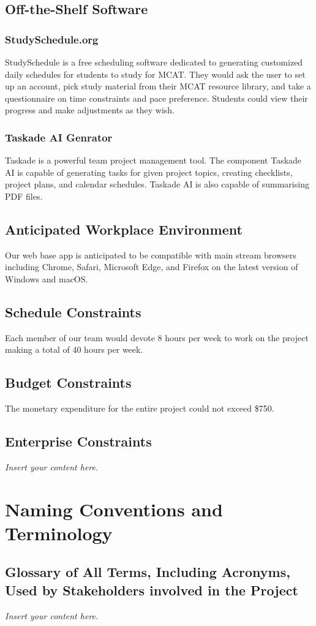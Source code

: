 \documentclass[12pt]{article}
\newcommand{\lips}{\textit{Insert your content here.}}
\begin{document}
\subsection{Off-the-Shelf Software}
\subsubsection{StudySchedule.org}
StudySchedule is a free scheduling software dedicated to generating customized daily schedules for students to study for MCAT. They would ask the user to set up an account, pick study material from their MCAT resource library, and take a questionnaire on time constraints and pace preference. Students could view their progress and make adjustments as they wish.
\subsubsection{Taskade AI Genrator}
Taskade is a powerful team project management tool. The component Taskade AI is capable of generating tasks for given project topics, creating checklists, project plans, and calendar schedules. Taskade AI is also capable of summarising PDF files.
\subsection{Anticipated Workplace Environment}
Our web base app is anticipated to be compatible with main stream browsers including Chrome, Safari, Microsoft Edge, and Firefox on the latest version of Windows and macOS.
\subsection{Schedule Constraints}
Each member of our team would devote 8 hours per week to work on the project making a total of 40 hours per week.
\subsection{Budget Constraints}
The monetary expenditure for the entire project could not exceed \$750.
\subsection{Enterprise Constraints}
\lips

\section{Naming Conventions and Terminology}
\subsection{Glossary of All Terms, Including Acronyms, Used by Stakeholders
involved in the Project}
\lips
\end{document}
